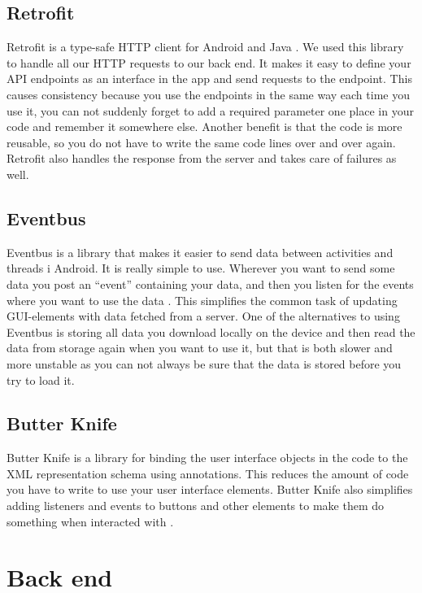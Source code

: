 \documentclass[../Main/thesis.tex]{subfiles}
\begin{document}
\subsection{Retrofit}
Retrofit is a type-safe HTTP client for Android and Java \citep{SquareInc.2017}.
We used this library to handle all our HTTP requests to our back end. 
It makes it easy to define your API endpoints as an interface in the app and send requests to the endpoint.
This causes consistency because you use the endpoints in the same way each time you use it, you can not suddenly forget to add a required parameter one place in your code and remember it somewhere else.
Another benefit is that the code is more reusable, so you do not have to write the same code lines over and over again.
Retrofit also handles the response from the server and takes care of failures as well.

\subsection{Eventbus}
Eventbus is a library that makes it easier to send data between activities and threads i Android. 
It is really simple to use.
Wherever you want to send some data you post an ``event'' containing your data, and then you listen for the events where you want to use the data \citep{Greenrobot2016}.
This simplifies the common task of updating GUI-elements with data fetched from a server.
One of the alternatives to using Eventbus is storing all data you download locally on the device and then read the data from storage again when you want to use it, but that is both slower and more unstable as you can not always be sure that the data is stored before you try to load it. 

\subsection{Butter Knife}
Butter Knife is a library for binding the user interface objects in the code to the XML representation schema using annotations.
This reduces the amount of code you have to write to use your user interface elements. 
Butter Knife also simplifies adding listeners and events to buttons and other elements to make them do something when interacted with \citep{Wharton2018}.

\section{Back end}
\end{document}
